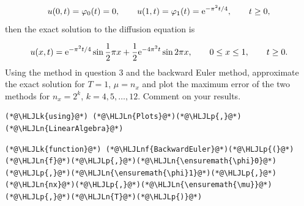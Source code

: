 \documentclass[12pt,a4paper]{article}
\newcommand{\HLJLk}[1]{\textcolor[RGB]{148,91,176}{\textbf{#1}}}
\newcommand{\HLJLn}[1]{#1}
\newcommand{\HLJLnf}[1]{\textcolor[RGB]{66,102,213}{#1}}
\newcommand{\HLJLp}[1]{#1}
\begin{document}
\[
u(0,t) = \varphi_0(t) = 0, \qquad  u(1,t) = \varphi_1(t) = {\rm e}^{-\pi^2 t/4}, \qquad t \geq 0,
\]
then the exact solution to the diffusion equation is

\[
u(x,t) = {\rm e}^{-\pi^2 t/4}\sin \frac{1}{2}\pi x + \frac{1}{2}{\rm e}^{-4\pi^2 t}\sin 2\pi x, \qquad 0 \leq x \leq 1, \qquad t \geq 0.
\]
Using the method in question 3 and the backward Euler method, approximate the exact solution for $T = 1$, $\mu = n_x$ and plot the maximum error of the two methods for $n_x = 2^k$, $k = 4, 5, \ldots, 12$.  Comment on your results.


\begin{lstlisting}
(*@\HLJLk{using}@*) (*@\HLJLn{Plots}@*)(*@\HLJLp{,}@*) (*@\HLJLn{LinearAlgebra}@*)
\end{lstlisting}


\begin{lstlisting}
(*@\HLJLk{function}@*) (*@\HLJLnf{BackwardEuler}@*)(*@\HLJLp{(}@*)(*@\HLJLn{f}@*)(*@\HLJLp{,}@*)(*@\HLJLn{\ensuremath{\phi}0}@*)(*@\HLJLp{,}@*)(*@\HLJLn{\ensuremath{\phi}1}@*)(*@\HLJLp{,}@*)(*@\HLJLn{nx}@*)(*@\HLJLp{,}@*)(*@\HLJLn{\ensuremath{\mu}}@*)(*@\HLJLp{,}@*)(*@\HLJLn{T}@*)(*@\HLJLp{)}@*)
    

\end{lstlisting}
\end{document}
